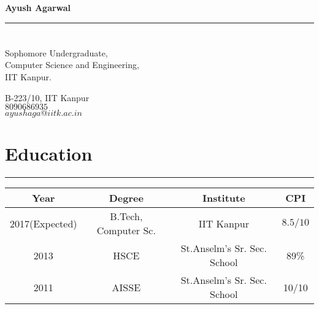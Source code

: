 \documentclass[a4paper]{article}
\author{Ayush Agarwal}
\begin{document}
\begin{center}
 \huge\textbf{Ayush Agarwal}\\
\end{center}
\hrule
\section*{}
\begin{minipage}{.45\linewidth}
\begin{flushleft}
 Sophomore Undergraduate,\\
 Computer Science and Engineering,\\
 IIT Kanpur.
 \end{flushleft}
 \end{minipage}
 \hfill
 \begin{minipage}{.45\linewidth}
 \begin{flushright}
 B-223/10, IIT Kanpur\\
 $8090686935$\\
 $ayushaga@iitk.ac.in$\\
 \end{flushright}
 \end{minipage}
 \vspace{3mm}
 \section*{Education}
 \hrule
 \begin{center}
 \vspace{3mm}
  \begin{tabular}{|c|c|c|c|}
  \hline
  Year & Degree & Institute & CPI\\
  \hline
  2017(Expected)& B.Tech, Computer Sc.&IIT Kanpur&$8.5/10$\\
  \hline
  2013& HSCE&St.Anselm's Sr. Sec. School&89\% \\
  \hline
  2011& AISSE&St.Anselm's Sr. Sec. School&10/10 \\
  \hline
  \end{tabular}
 \end{center} 
  
\end{document}
